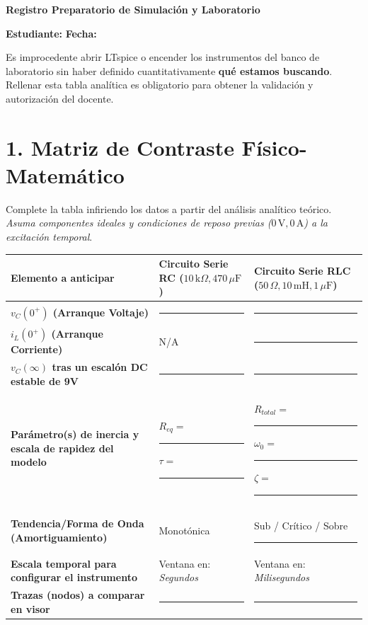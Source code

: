 \documentclass[11pt, a4paper]{article}
\begin{document}
\begin{tcolorbox}[colback=ucbblue!5!white, colframe=ucbblue, title=\textbf{Protocolo de Predicción: Análisis Transitorio RC frente a RLC}]
    \centering \textbf{Registro Preparatorio de Simulación y Laboratorio}
\end{tcolorbox}

\textbf{Estudiante:} \hrulefill \quad \textbf{Fecha:} \hrulefill

\vspace{0.4cm}
\begin{tcolorbox}[colback=warnred!5!white, colframe=warnred, title=\textbf{Prohibición Operativa (¡Atención!)}]
Es improcedente abrir LTspice o encender los instrumentos del banco de laboratorio sin haber definido cuantitativamente \textbf{qué estamos buscando}. Rellenar esta tabla analítica es obligatorio para obtener la validación y autorización del docente.
\end{tcolorbox}

\section*{1. Matriz de Contraste Físico-Matemático}
Complete la tabla infiriendo los datos a partir del análisis analítico teórico. \textit{Asuma componentes ideales y condiciones de reposo previas ($0\,\text{V}, 0\,\text{A}$) a la excitación temporal}.

\vspace{0.3cm}
\renewcommand{\arraystretch}{2}
\noindent
\begin{tabularx}{\textwidth}{>{\bfseries\RaggedRight}p{4cm} >{\RaggedRight\arraybackslash}X >{\RaggedRight\arraybackslash}X}
\toprule
\textbf{Elemento a anticipar} & \textbf{Circuito Serie RC} \newline ($10\,\text{k}\Omega, 470\,\mu\text{F}$) & \textbf{Circuito Serie RLC} \newline ($50\,\Omega, 10\,\text{mH}, 1\,\mu\text{F}$) \\ 
\midrule
$v_C(0^+)$ (Arranque Voltaje) & \rule{3cm}{0.4pt} & \rule{3cm}{0.4pt} \\ 
$i_L(0^+)$ (Arranque Corriente) & N/A & \rule{3cm}{0.4pt} \\ 
$v_C(\infty)$ tras un escalón DC estable de 9V & \rule{3cm}{0.4pt} & \rule{3cm}{0.4pt} \\ 
Parámetro(s) de inercia y escala de rapidez del modelo & $R_{eq} =$ \rule{2cm}{0.4pt} \newline $\tau =$ \rule{2.5cm}{0.4pt} & $R_{total} =$ \rule{1.5cm}{0.4pt} \newline $\omega_0 =$ \rule{2.5cm}{0.4pt} \newline $\zeta =$ \rule{2.5cm}{0.4pt} \\ 
Tendencia/Forma de Onda (Amortiguamiento) & Monotónica & Sub / Crítico / Sobre \newline \rule{3cm}{0.4pt} \\ 
Escala temporal para configurar el instrumento & Ventana en: \textit{Segundos} & Ventana en: \textit{Milisegundos} \\ 
Trazas (nodos) a comparar en visor & \rule{3.5cm}{0.4pt} & \rule{3.5cm}{0.4pt} \\ 
\bottomrule
\end{tabularx}
\end{document}
